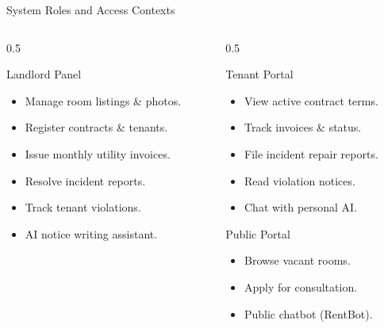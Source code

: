 \documentclass[10pt]{beamer}
\begin{document}
\begin{frame}{System Roles and Access Contexts}
    \begin{columns}
        \begin{column}{0.5\textwidth}
            \begin{block}{Landlord Panel}
                \begin{itemize}
                    \item Manage room listings \& photos.
                    \item Register contracts \& tenants.
                    \item Issue monthly utility invoices.
                    \item Resolve incident reports.
                    \item Track tenant violations.
                    \item AI notice writing assistant.
                \end{itemize}
            \end{block}
        \end{column}
        
        \begin{column}{0.5\textwidth}
            \begin{block}{Tenant Portal}
                \begin{itemize}
                    \item View active contract terms.
                    \item Track invoices \& status.
                    \item File incident repair reports.
                    \item Read violation notices.
                    \item Chat with personal AI.
                \end{itemize}
            \end{block}
            \begin{block}{Public Portal}
                \begin{itemize}
                    \item Browse vacant rooms.
                    \item Apply for consultation.
                    \item Public chatbot (RentBot).
                \end{itemize}
            \end{block}
        \end{column}
    \end{columns}
\end{frame}
\end{document}

